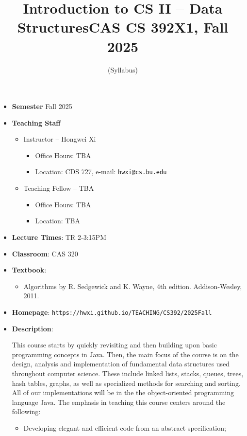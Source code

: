 \documentclass[11pt]{article}
\title{Introduction to CS II -- Data Structures\break CAS CS 392X1, Fall 2025}
\author{(Syllabus)}
\date{}
\begin{document}
\maketitle
\thispagestyle{empty}

\begin{itemize}
\item {\bf Semester} Fall 2025
\item {\bf Teaching Staff}
\begin{itemize}
\item
Instructor -- Hongwei Xi
\begin{itemize}
\item
Office Hours: TBA
\item
Location: CDS 727, e-mail: \texttt{hwxi@cs.bu.edu}
\end{itemize}

\item
Teaching Fellow -- TBA
\begin{itemize}
\item
Office Hours: TBA
\item
Location: TBA
\end{itemize}
\end{itemize}

\item {\bf Lecture Times}: TR 2-3:15PM
\item {\bf Classroom}: CAS 320
\item {\bf Textbook}:\kern6pt
\begin{itemize}
\item
Algorithms by R. Sedgewick and K. Wayne, 4th edition. Addison-Wesley, 2011.
\end{itemize}

\item {\bf Homepage}:
{\tt  https://hwxi.github.io/TEACHING/CS392/2025Fall}

\item {\bf Description}:

This course starts by quickly revisiting and then building upon basic
programming concepts in Java. Then, the main focus of the course is on
the design, analysis and implementation of fundamental data structures
used throughout computer science. These include linked lists, stacks,
queues, trees, hash tables, graphs, as well as specialized methods for
searching and sorting. All of our implementations will be in the the
object-oriented programming language Java. The emphasis in teaching
this course centers around the following:

\begin{itemize}
\item
Developing elegant and efficient code from an abstract specification;


\end{itemize}
\end{itemize}
\end{document}
